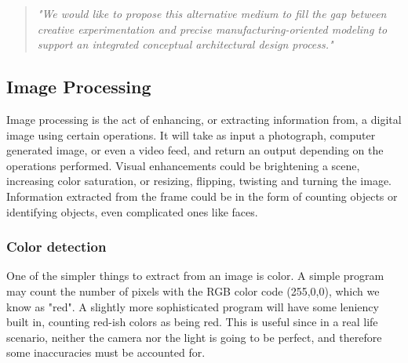 			\begin{quote}
				\textit{"We would like to propose this alternative medium to fill the gap between creative experimentation and precise manufacturing-oriented modeling to support an integrated conceptual architectural design process."}\cite{sketchingVsCAD}\label{proposalForMedium}\\
			\end{quote}

			\subsection{Image Processing}
			Image processing is the act of enhancing, or extracting information from, a digital image using certain operations. It will take as input a photograph, computer generated image, or even a video feed, and return an output depending on the operations performed. Visual enhancements could be brightening a scene, increasing color saturation, or resizing, flipping, twisting and turning the image. Information extracted from the frame could be  in the form of counting objects or identifying objects, even complicated ones like faces. 
			
			\subsubsection{Color detection}
			One of the simpler things to extract from an image is color. A simple program may count the number of pixels with the RGB color code (255,0,0), which we know as "red". A slightly more sophisticated program will have some leniency built in, counting red-ish colors as being red. This is useful since in a real life scenario, neither the camera nor the light is going to be perfect, and therefore some inaccuracies must be accounted for. 
			
